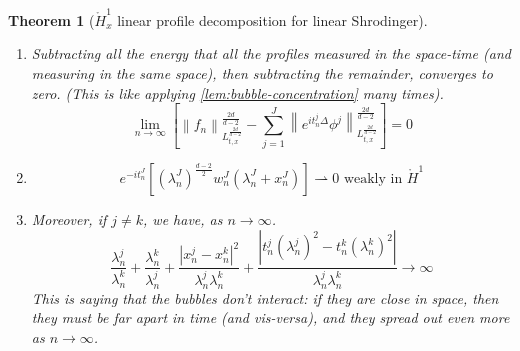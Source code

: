 \documentclass{article}
\newtheorem{theorem}{Theorem}
\newcommand\norm[1]{\left\lVert#1\right\rVert}
\begin{document}
\begin{theorem}[$\mathring{H}_x^1$ linear profile decomposition for linear Shrodinger]
\begin{enumerate}
\begin{equation*}
    \end{equation*}
    \item Subtracting all the energy that all the profiles measured in the
    space-time (and measuring in the same space), then subtracting the
    remainder, converges to zero. (This is like applying
    \cref{lem:bubble-concentration} many times).
    \begin{equation*}
      \lim_{n\to\infty}
      \left[ \norm{f_{n}}_{L_{t,x}^{\frac{2d}{d-2}}}^{\frac{2d}{d-2}}
        -\sum_{j=1}^{J}
        \norm{e^{it_{n}^{j}\Delta}\phi^{j}}_{L_{t,x}^{\frac{2d}{d-2}}}^{\frac{2d}{d-2}}
      \right] 
      = 0
    \end{equation*}
    \item
    \begin{equation*}
      e^{-it_{n}^{J}}\left[ \left( \lambda_{n}^{J}
        \right)^{\frac{d-2}{2}}w_{n}^{J}(\lambda_{n}^{J}+x_{n}^{J})  \right]
      \rightharpoonup  0 \text{ weakly in }\mathring{H}^{1}
    \end{equation*}
    \item Moreover, if $j \neq k$,  we have, as $n \to \infty$.
    \begin{equation*} \frac{\lambda_{n}^{j}}{\lambda_{n}^{k}}+\frac{\lambda_{n}^{k}}{\lambda_{n}^{j}}+ \frac{\left| x_{n}^{j}-x_{n}^{k} \right|^{2}}{\lambda_{n}^{j}\lambda_{n}^{k}}+\frac{\left| t_{n}^{j}(\lambda_{n}^{j})^{2}-t_{n}^{k}(\lambda_{n}^{k})^{2} \right|}{\lambda_{n}^{j}\lambda_{n}^{k}} \to \infty
    \end{equation*}
    This is saying that the bubbles don't interact: if they are close in space,
    then they must be far apart in time (and vis-versa), and they spread out
    even more as $n \to\infty$. 
  \end{enumerate}
\end{theorem}
\end{document}
